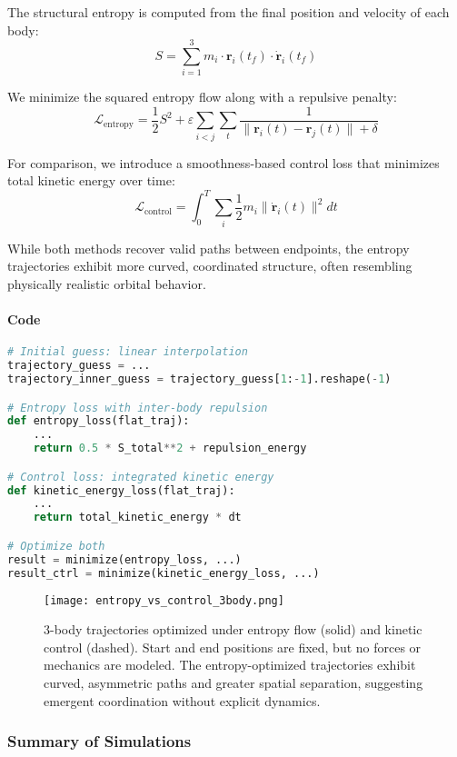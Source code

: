 \documentclass[12pt]{article}
\begin{document}
The structural entropy is computed from the final position and velocity of each body:
\[
S = \sum_{i=1}^{3} m_i \cdot \mathbf{r}_i(t_f) \cdot \dot{\mathbf{r}}_i(t_f)
\]

We minimize the squared entropy flow along with a repulsive penalty:
\[
\mathcal{L}_{\text{entropy}} = \frac{1}{2} S^2 + \varepsilon \sum_{i<j} \sum_t \frac{1}{\|\mathbf{r}_i(t) - \mathbf{r}_j(t)\| + \delta}
\]

For comparison, we introduce a smoothness-based control loss that minimizes total kinetic energy over time:
\[
\mathcal{L}_{\text{control}} = \int_0^T \sum_i \frac{1}{2} m_i \|\dot{\mathbf{r}}_i(t)\|^2 dt
\]

While both methods recover valid paths between endpoints, the entropy trajectories exhibit more curved, coordinated structure, often resembling physically realistic orbital behavior.

\paragraph*{Code}\mbox{}
\begin{lstlisting}[language=Python]
# Initial guess: linear interpolation
trajectory_guess = ...
trajectory_inner_guess = trajectory_guess[1:-1].reshape(-1)

# Entropy loss with inter-body repulsion
def entropy_loss(flat_traj):
    ...
    return 0.5 * S_total**2 + repulsion_energy

# Control loss: integrated kinetic energy
def kinetic_energy_loss(flat_traj):
    ...
    return total_kinetic_energy * dt

# Optimize both
result = minimize(entropy_loss, ...)
result_ctrl = minimize(kinetic_energy_loss, ...)
\end{lstlisting}

\begin{figure}[H]
\centering
\texttt{[image: entropy\_vs\_control\_3body.png]}
\caption{
3-body trajectories optimized under entropy flow (solid) and kinetic control (dashed). Start and end positions are fixed, but no forces or mechanics are modeled. The entropy-optimized trajectories exhibit curved, asymmetric paths and greater spatial separation, suggesting emergent coordination without explicit dynamics.
}
\end{figure}


\subsubsection{Summary of Simulations}
\end{document}
